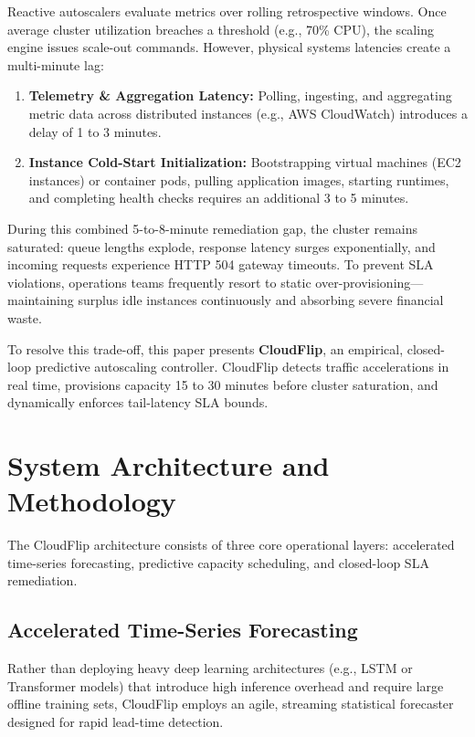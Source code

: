 \documentclass[10pt,journal,compsoc]{IEEEtran}
\begin{document}
Reactive autoscalers evaluate metrics over rolling retrospective windows. Once average cluster utilization breaches a threshold (e.g., 70\% CPU), the scaling engine issues scale-out commands. However, physical systems latencies create a multi-minute lag:
\begin{enumerate}
    \item \textbf{Telemetry \& Aggregation Latency:} Polling, ingesting, and aggregating metric data across distributed instances (e.g., AWS CloudWatch) introduces a delay of 1 to 3 minutes.
    \item \textbf{Instance Cold-Start Initialization:} Bootstrapping virtual machines (EC2 instances) or container pods, pulling application images, starting runtimes, and completing health checks requires an additional 3 to 5 minutes.
\end{enumerate}

During this combined 5-to-8-minute remediation gap, the cluster remains saturated: queue lengths explode, response latency surges exponentially, and incoming requests experience HTTP 504 gateway timeouts. To prevent SLA violations, operations teams frequently resort to static over-provisioning---maintaining surplus idle instances continuously and absorbing severe financial waste.

To resolve this trade-off, this paper presents \textbf{CloudFlip}, an empirical, closed-loop predictive autoscaling controller. CloudFlip detects traffic accelerations in real time, provisions capacity 15 to 30 minutes before cluster saturation, and dynamically enforces tail-latency SLA bounds.

\section{System Architecture and Methodology}
The CloudFlip architecture consists of three core operational layers: accelerated time-series forecasting, predictive capacity scheduling, and closed-loop SLA remediation.

\subsection{Accelerated Time-Series Forecasting}
Rather than deploying heavy deep learning architectures (e.g., LSTM or Transformer models) that introduce high inference overhead and require large offline training sets, CloudFlip employs an agile, streaming statistical forecaster designed for rapid lead-time detection.
\end{document}
